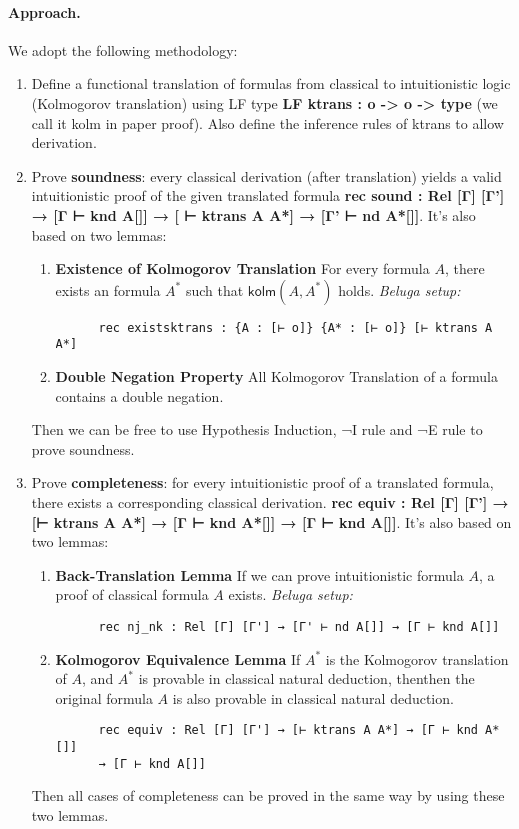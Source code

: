 \documentclass{article}
\begin{document}
\paragraph{Approach.} We adopt the following methodology:
\begin{enumerate}
    \item Define a functional translation of formulas from classical to intuitionistic logic (Kolmogorov translation) using LF type \textbf{LF ktrans : o -> o -> type} (we call it kolm in paper proof). Also define the inference rules of ktrans to allow derivation.
    \item Prove \textbf{soundness}: every classical derivation (after translation) yields a valid intuitionistic proof of the given translated formula \textbf{ rec sound : Rel [Γ] [Γ'] → [Γ ⊢ knd A[]] → [ ⊢ ktrans A A*] → [Γ' ⊢ nd A*[]]}. It's also based on two lemmas:
    \begin{enumerate}
      \item \textbf{Existence of Kolmogorov Translation}  
      For every formula $A$, there exists an formula $A^*$ such that $\textsf{kolm}(A, A^*)$ holds.  
      \textit{Beluga setup:}
      \begin{verbatim}
      rec existsktrans : {A : [⊢ o]} {A* : [⊢ o]} [⊢ ktrans A A*]
      \end{verbatim}
    
      \item \textbf{Double Negation Property}  
      All Kolmogorov Translation of a formula contains a double negation. 
    \end{enumerate}
    Then we can be free to use Hypothesis Induction, ¬I rule and ¬E rule to prove soundness.
    \item Prove \textbf{completeness}: for every intuitionistic proof of a  translated formula, there exists a corresponding classical derivation. \textbf{rec equiv : Rel [Γ] [Γ'] → [⊢ ktrans A A*] → [Γ ⊢ knd A*[]] → [Γ ⊢ knd A[]]}. It's also based on two lemmas:
    \begin{enumerate}
      \item \textbf{Back-Translation Lemma}  
      If we can prove intuitionistic formula $A$, a proof of classical formula $A$ exists.  
      \textit{Beluga setup:}
      \begin{verbatim}
      rec nj_nk : Rel [Γ] [Γ'] → [Γ' ⊢ nd A[]] → [Γ ⊢ knd A[]]
      \end{verbatim}
    
      \item \textbf{Kolmogorov Equivalence Lemma}  
      If $A^*$ is the Kolmogorov translation of $A$, and $A^*$ is provable in classical natural deduction, thenthen the original formula $A$ is also provable in classical natural deduction.
      \begin{verbatim}
      rec equiv : Rel [Γ] [Γ'] → [⊢ ktrans A A*] → [Γ ⊢ knd A*[]] 
      → [Γ ⊢ knd A[]]
      \end{verbatim}
    \end{enumerate}
    Then all cases of completeness can be proved in the same way by using these two lemmas.
\end{enumerate}
\end{document}
